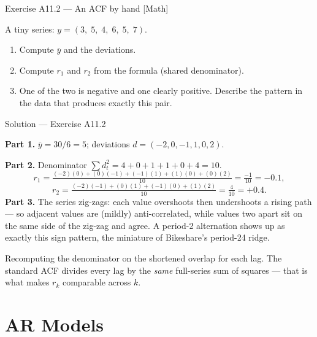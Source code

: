 \documentclass[aspectratio=169,11pt]{beamer}
\begin{document}
\begin{frame}{Exercise A11.2 --- An ACF by hand [Math]}
  \begin{exercise}
    A tiny series: $y = (3,\; 5,\; 4,\; 6,\; 5,\; 7)$.
    \begin{enumerate}
      \item Compute $\bar y$ and the deviations.
      \item Compute $r_1$ and $r_2$ from the formula (shared denominator).
      \item One of the two is negative and one clearly positive. Describe the
            pattern in the data that produces exactly this pair.
    \end{enumerate}
  \end{exercise}
\end{frame}

\begin{frame}{Solution --- Exercise A11.2}
  \begin{solutionbox}
    \footnotesize
    \textbf{Part 1.} $\bar y = 30/6 = 5$; deviations $d = (-2, 0, -1, 1, 0, 2)$.
    \par\smallskip
    \textbf{Part 2.} Denominator $\sum d_t^2 = 4 + 0 + 1 + 1 + 0 + 4 = 10$.
    \[
      r_1 = \tfrac{(-2)(0) + (0)(-1) + (-1)(1) + (1)(0) + (0)(2)}{10}
          = \tfrac{-1}{10} = \mathbf{-0.1},
    \]
    \[
      r_2 = \tfrac{(-2)(-1) + (0)(1) + (-1)(0) + (1)(2)}{10}
          = \tfrac{4}{10} = \mathbf{+0.4}.
    \]
    \textbf{Part 3.} The series zig-zags: each value overshoots then undershoots a
    rising path --- so adjacent values are (mildly) anti-correlated, while values
    two apart sit on the same side of the zig-zag and agree. A period-2
    alternation shows up as exactly this sign pattern, the miniature of
    Bikeshare's period-24 ridge.
  \end{solutionbox}
  \begin{mistake}
    Recomputing the denominator on the shortened overlap for each lag. The standard
    ACF divides every lag by the \emph{same} full-series sum of squares --- that is
    what makes $r_k$ comparable across $k$.
  \end{mistake}
\end{frame}

\section{AR Models}
\end{document}
